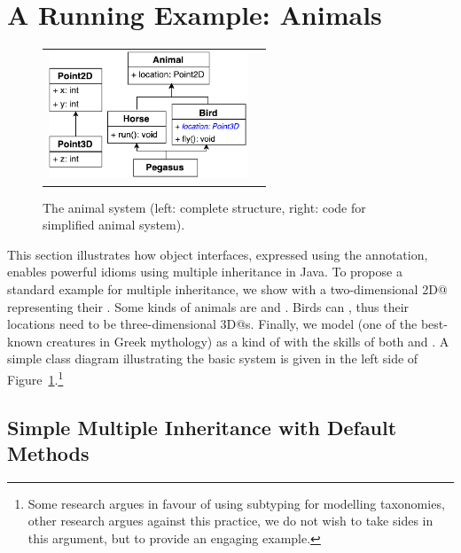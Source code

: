 \section{A Running Example: Animals}\label{sec:ep}

\begin{figure}
\begin{tabular}{c|c}
\includegraphics[height=3.8cm]{PegasusDetail.pdf}\hspace{20pt} &
\begin{minipage}{7cm}
\vspace{-90pt}
\end{minipage}
\end{tabular}
\caption{The animal system (left: complete structure, right: code for simplified animal system).}\label{fig:pegasus}
\end{figure}

This section illustrates how object interfaces, expressed using the \mixinAnn{} annotation, enables powerful
idioms using multiple inheritance in Java.
To propose a standard example for multiple inheritance, we show \Q@Animal@s with a two-dimensional \Q@Point2D@ representing their \Q@location@.
Some kinds of animals are \Q@Horse@s and \Q@Bird@s.
Birds can \Q@fly@, thus their locations need to be three-dimensional \Q@Point3D@s.
Finally, we model \Q@Pegasus@ (one of the best-known creatures in Greek
mythology) as a kind of \Q@Animal@ with the skills
of both \Q@Horse@s and \Q@Bird@s. A simple class diagram illustrating
the basic system is given in the left side of Figure~\ref{fig:pegasus}.\footnote{
Some research argues in favour of using subtyping for modelling taxonomies, other research argues against this practice, we do not wish to take sides in this argument, but to provide an engaging example.}

\subsection{Simple Multiple Inheritance with Default
  Methods}\label{sec:simple}

